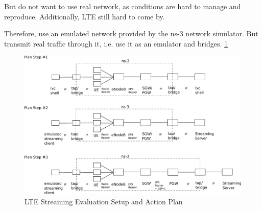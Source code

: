 But do not want to use real network, as conditions are hard to manage and reproduce. Additionally, LTE still hard to come by.

Therefore, use an emulated network provided by the ns-3 network simulator. But transmit real traffic through it, i.e. use it as an emulator and bridges. \ref{fig:lte-testbed}

\begin{figure}[htb]
\centering
\includegraphics[width=\textwidth]{images/lte-testbed.pdf}
\caption{\gls{LTE} Streaming Evaluation Setup and Action Plan}
\label{fig:lte-testbed}
\end{figure}